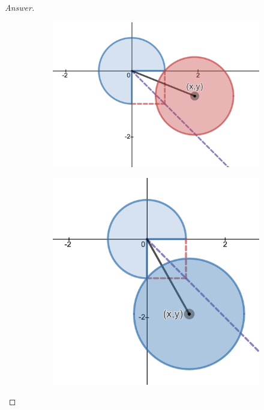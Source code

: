 \documentclass[12pt]{article}
\theoremstyle{definition}
\begin{document}
\begin{proof}[Answer]
\begin{enumerate}
\begin{enumerate}
\begin{figure}[h]
                \begin{subfigure}{0.5\textwidth}
                    \includegraphics[width=\textwidth]{4} 
                    \caption{}
                    \label{fig:fig4}
                \end{subfigure}
                \begin{subfigure}{0.5\textwidth}
                    \includegraphics[width=\textwidth]{5}
                    \caption{}
                    \label{fig:fig5}
                \end{subfigure}


\end{figure}
\end{enumerate}
\end{enumerate}
\end{proof}
\end{document}
